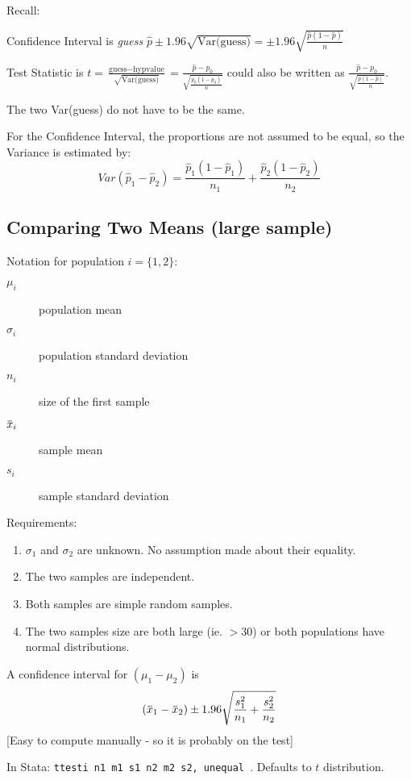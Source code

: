 \documentclass[11pt, oneside]{article}   	%
\newcommand{\overbar}[1]{\mkern 1.5mu\overline{\mkern-1.5mu#1\mkern-1.5mu}\mkern 1.5mu}
\begin{document}
Recall:

Confidence Interval is \textit{guess} $\hat{p} \pm1.96 \sqrt{\text{Var(guess)}} = \pm 1.96 \sqrt { \frac{\hat{p}(1-\hat{p}) } { n}}$

Test Statistic is $t = \frac{\text{guess} - \text{hypvalue}} { \sqrt { \text{Var(guess)} } } = \frac{\hat{p} - p_0 } {\sqrt{\frac{p_0(1-p_0)} {n}}  } $ could also be written as $\frac{\hat{p} - p_0 } {\sqrt{\frac{\hat{p}(1-\hat{p})} {n}}  }  $.

The two Var(guess) do not have to be the same.

For the Confidence Interval, the proportions are not assumed to be equal, so the Variance is estimated by:
\[
Var(\hat{p}_1 - \hat{p}_2) = \frac{\hat{p}_1(1-\hat{p}_1)}{n_1} + \frac{\hat{p}_2(1-\hat{p}_2)}{n_2} 
\]

\subsection{Comparing Two Means (large sample)}

Notation for population $i = \{1, 2\}$:

 \begin{description}
 \item [$\mu_i$]population mean
 \item[$\sigma_i$]population standard deviation
 \item[$n_i$]size of the first sample
 \item[$\overbar{x}_i$]sample mean
 \item[$s_i$]sample standard deviation
 \end{description}

Requirements:
\begin{enumerate}
\item{$\sigma_1$ and $\sigma_2$ are unknown. No assumption made about their equality.}
\item{The two samples are independent.}
\item{Both samples are simple random samples.}
\item{The two samples size are both large (ie. $> 30$) or both populations have normal distributions.}
\end{enumerate}

A confidence interval for $(\mu_1 - \mu_2 )$ is
\[
(\overbar{x}_1 - \overbar{x}_2) \pm 1.96 \sqrt{ \frac{s^2_1 } {n_1 } + \frac{s^2_2 } {n_2 }     }
\]
[Easy to compute manually - so it is probably on the test]

In Stata: \texttt {ttesti n1 m1 s1 n2 m2 s2, unequal }. Defaults to $t$ distribution.
\end{document}
